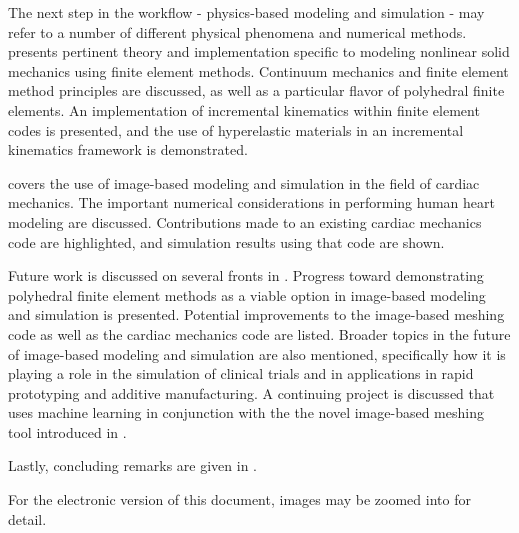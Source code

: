 The next step in the workflow - physics-based modeling and simulation - may refer to a number of different physical phenomena and numerical methods.  presents pertinent theory and implementation specific to modeling nonlinear solid mechanics using finite element methods. Continuum mechanics and finite element method principles are discussed, as well as a particular flavor of polyhedral finite elements. An implementation of incremental kinematics within finite element codes is presented, and the use of hyperelastic materials in an incremental kinematics framework is demonstrated.

 covers the use of image-based modeling and simulation in the field of cardiac mechanics. The important numerical considerations in performing human heart modeling are discussed. Contributions made to an existing cardiac mechanics code are highlighted, and simulation results using that code are shown. 

Future work is discussed on several fronts in . Progress toward demonstrating polyhedral finite element methods as a viable option in image-based modeling and simulation is presented. Potential improvements to the image-based meshing code as well as the cardiac mechanics code are listed. Broader topics in the future of image-based modeling and simulation are also mentioned, specifically how it is playing a role in the simulation of clinical trials and in applications in rapid prototyping and additive manufacturing. A continuing project is discussed that uses machine learning in conjunction with the the novel image-based meshing tool introduced in .

Lastly, concluding remarks are given in .

For the electronic version of this document, images may be zoomed into for detail.
